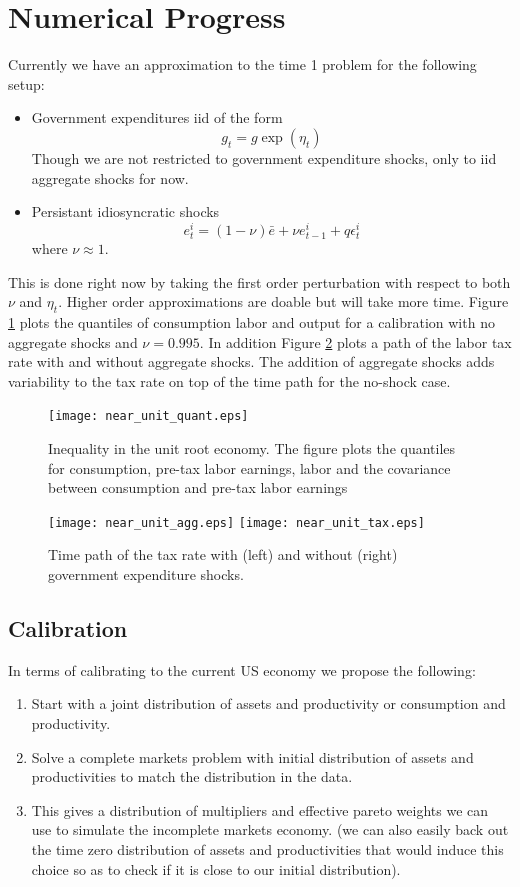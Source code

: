 \documentclass[thmsb,11pt]{article}
\begin{document}
\section{Numerical Progress}
Currently we have an approximation to the time 1 problem for the following setup:
\begin{itemize}
	\item Government expenditures iid of the form
	\[
		g_t = g\exp(\eta_t)
	\]Though we are not restricted to government expenditure shocks, only to iid aggregate shocks for now.
	\item  Persistant idiosyncratic shocks
	\[
		e^i_t=(1-\nu)\bar{e}+\nu e^i_{t-1}+q\epsilon^i_t
	\]where $\nu \approx 1$.
\end{itemize}  This is done right now by taking the first order perturbation with respect to both $\nu$ and $\eta_t$.  Higher order approximations are doable but will take more time.  Figure \ref{fig:near_unit_quant} plots the quantiles of consumption labor and output for a calibration with no aggregate shocks and $\nu = 0.995$.  In addition Figure \ref{fig:near_unit_tax} plots a path of the labor tax rate with and without aggregate shocks.  The addition of aggregate shocks adds variability to the tax rate on top of the time path for the no-shock case.
\begin{figure}[htp]
\centering
	\texttt{[image: near\_unit\_quant.eps]}
	\caption{Inequality in the unit root  economy. The figure plots the quantiles for consumption, pre-tax labor earnings, labor and the covariance between consumption and pre-tax labor earnings\label{fig:near_unit_quant}}
\end{figure}
\begin{figure}[htp]
	\centering
	\texttt{[image: near\_unit\_agg.eps]}
	\texttt{[image: near\_unit\_tax.eps]}
	\caption{Time path of the tax rate with (left) and without (right) government expenditure shocks.\label{fig:near_unit_tax}}
\end{figure}
\newpage
\subsection{Calibration}
In terms of calibrating to the current US economy we propose the following:
\begin{enumerate}
	\item  Start with a joint distribution of assets and productivity or consumption and productivity.
	\item  Solve a complete markets problem with initial distribution of assets and productivities to match the distribution in the data.
	\item  This gives a distribution of multipliers and effective pareto weights we can use to simulate the incomplete markets economy. (we can also easily back out the time zero distribution of assets and productivities that would induce this choice so as to check if it is close to our initial distribution).
\end{enumerate}
\end{document}
